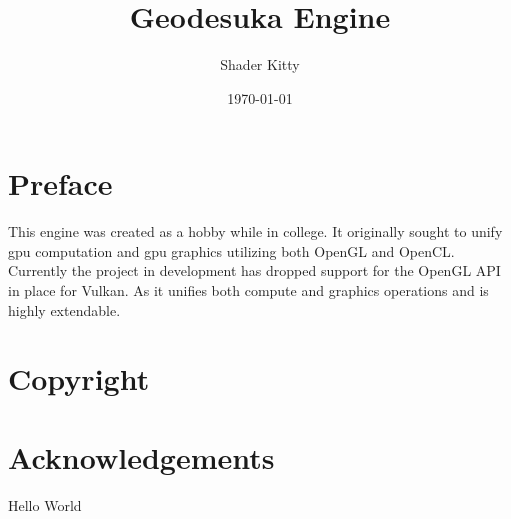 \documentclass{book}
\title{Geodesuka Engine}
\author{Shader Kitty}
\date{\today}
\begin{document}
\maketitle

\tableofcontents

\frontmatter
\chapter{Preface}
This engine was created as a hobby while in college. It originally sought to unify gpu computation and gpu graphics utilizing both OpenGL and OpenCL. Currently
the project in development has dropped support for the OpenGL API in place for Vulkan. As it unifies both compute and graphics operations and is highly extendable.
\mainmatter

\chapter{Copyright}

\chapter{Acknowledgements}

Hello World
\end{document}

